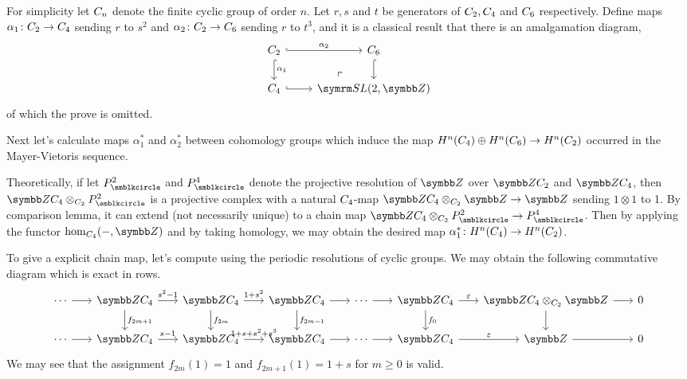 For simplicity let $C_{n}$ denote the finite cyclic group of order $n$. Let $r, s$ and $t$ be generators of $C_{2}, C_{4}$ and $C_{6}$ respectively. Define maps $\alpha_1\colon C_{2}\to C_{4}$ sending $r$ to $s^2$ and $\alpha_2\colon C_{2}\to C_{6}$ sending $r$ to $t^3$, and it is a classical result that there is an amalgamation diagram,
\begin{equation*}
  \begin{tikzcd}
    \CYC2 & \CYC6\\
    \CYC4 & \SLtZ
    \arrow[from=1-1,hook,]{1-2}[]{\alpha_2}
    \arrow[from=2-1,hook,]{2-2}[]{}
    \arrow[from=1-1,hook,]{2-1}[]{\alpha_1}
    \arrow[from=1-2,hook,]{2-2}[]{}
    \arrow[from=1-1,phantom,]{2-2}[very near end,]{\ulcorner}
  \end{tikzcd}
\end{equation*}
of which the prove is omitted.

\vspace{\baselineskip}

Next let's calculate maps $\alpha_1^*$ and $\alpha_2^*$ between cohomology groups which induce the map $H^n(C_{4})\oplus H^n(C_{6})\to H^n(C_{2})$ occurred in the Mayer-Vietoris sequence.

Theoretically, if let $P_\CCCIR^2$ and $P_\CCCIR^4$ denote the projective resolution of $\ZZ$ over $\ZZ\CYC2$ and $\ZZ\CYC4$, then $\ZZ\CYC4\otimes_{\CYC2}P_\CCCIR^2$ is a projective complex with a natural $C_{4}$-map $\ZZ\CYC4\otimes_{\CYC2}\ZZ\to \ZZ$ sending $1\otimes 1$ to 1. By comparison lemma, it can extend (not necessarily unique) to a chain map $\ZZ\CYC4\otimes_{\CYC2}P_\CCCIR^2\to P_\CCCIR^4$. Then by applying the functor $\HOM_{\CYC4}(\BLANK, \ZZ)$ and by taking homology, we may obtain the desired map $\alpha_1^*\colon H^n(C_{4})\to H^n(C_{2})$.

To give a explicit chain map, let's compute using the periodic resolutions of cyclic groups. We may obtain the following commutative diagram which is exact in rows.
\begin{equation*}
  \begin{tikzcd}[column sep=scriptsize]
    \dotsb & \ZZ\CYC4 & \ZZ\CYC4 & \ZZ\CYC4 & \dotsb & \ZZ\CYC4 & \ZZ\CYC4\otimes_{\CYC2}\ZZ & 0\\
    \dotsb & \ZZ\CYC4 & \ZZ\CYC4 & \ZZ\CYC4 & \dotsb & \ZZ\CYC4 & \ZZ & 0
    \arrow[from=1-1,]{1-2}[]{}
    \arrow[from=1-2,]{1-3}[]{s^2-1}
    \arrow[from=1-3,]{1-4}[]{1+s^2}
    \arrow[from=1-4,]{1-5}[]{}
    \arrow[from=1-5,]{1-6}[]{}
    \arrow[from=1-6,]{1-7}[]{\varepsilon}
    \arrow[from=1-7,]{1-8}[]{}
    \arrow[from=2-1,]{2-2}[]{}
    \arrow[from=2-2,]{2-3}[]{s-1}
    \arrow[from=2-3,]{2-4}[]{1+s+s^2+s^3}
    \arrow[from=2-4,]{2-5}[]{}
    \arrow[from=2-5,]{2-6}[]{}
    \arrow[from=2-6,]{2-7}[]{\varepsilon}
    \arrow[from=2-7,]{2-8}[]{}
    \arrow[from=1-2,]{2-2}[]{f_{2m+1}}
    \arrow[from=1-3,]{2-3}[]{f_{2m}}
    \arrow[from=1-4,]{2-4}[]{f_{2m-1}}
    \arrow[from=1-6,]{2-6}[]{f_0}
    \arrow[from=1-7,]{2-7}[]{}
  \end{tikzcd}
\end{equation*}
We may see that the assignment $f_{2m}(1)=1$ and $f_{2m+1}(1)=1+s$ for $m\geq 0$ is valid.

